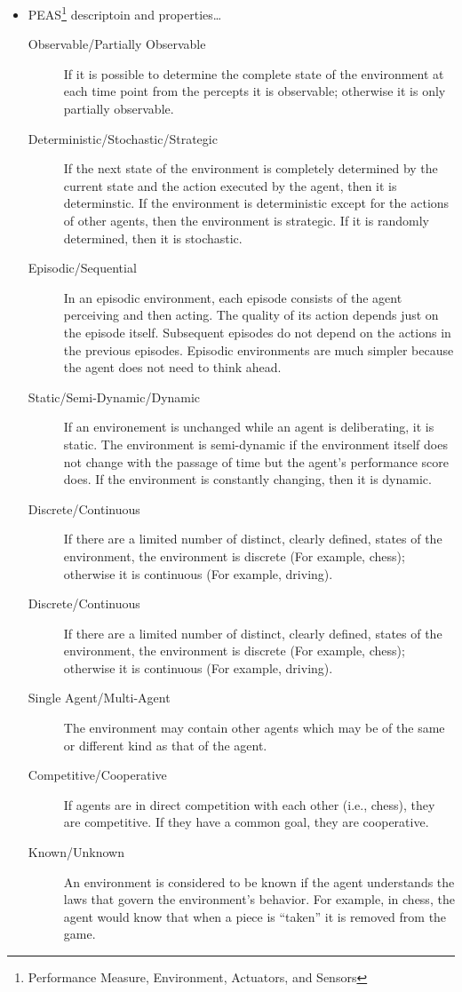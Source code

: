 \begin{itemize}
    \item PEAS\footnote{Performance Measure, Environment, Actuators, and Sensors} descriptoin and properties\ldots
        \begin{description}
            \item[Observable/Partially Observable] If it is possible to determine the complete state of the environment at each time point from the percepts it is observable; otherwise it is only partially observable.
            \item[Deterministic/Stochastic/Strategic] If the next state of the environment is completely determined by the current state and the action executed by the agent, then it is determinstic. If the environment is deterministic except for the actions of other agents, then the environment is strategic. If it is randomly determined, then it is stochastic.
            \item[Episodic/Sequential] In an episodic environment, each episode consists of the agent perceiving and then acting. The quality of its action depends just on the episode itself. Subsequent episodes do not depend on the actions in the previous episodes. Episodic environments are much simpler because the agent does not need to think ahead.
            \item[Static/Semi-Dynamic/Dynamic] If an environement is unchanged while an agent is deliberating, it is static. The environment is semi-dynamic if the environment itself does not change with the passage of time but the agent’s performance score does. If the environment is constantly changing, then it is dynamic.
            \item[Discrete/Continuous] If there are a limited number of distinct, clearly defined, states of the environment, the environment is discrete (For example, chess); otherwise it is continuous (For example, driving).
            \item[Discrete/Continuous] If there are a limited number of distinct, clearly defined, states of the environment, the environment is discrete (For example, chess); otherwise it is continuous (For example, driving).
            \item[Single Agent/Multi-Agent] The environment may contain other agents which may be of the same or different kind as that of the agent.
            \item[Competitive/Cooperative] If agents are in direct competition with each other (i.e., chess), they are competitive. If they have a common goal, they are cooperative.
            \item[Known/Unknown] An environment is considered to be known if the agent understands the laws that govern the environment's behavior. For example, in chess, the agent would know that when a piece is ``taken'' it is removed from the game.
        \end{description}


\end{itemize}
